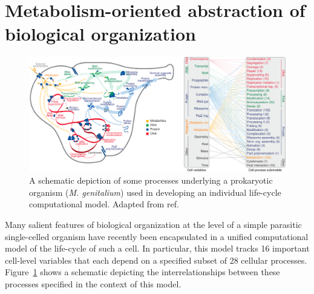\documentclass[10pt]{article}
\begin{document}
\section*{Metabolism-oriented abstraction of biological organization}

\begin{figure}
\begin{center}
\noindent\includegraphics[width=0.8\columnwidth]{fig/cellprocessesdiagram.pdf}
\end{center}
\caption{A schematic depiction of some processes underlying a prokaryotic organism (\emph{M. genitalium}) used in developing an individual life-cycle computational model. Adapted from ref.}
\label{fig:cellprocess}
\end{figure}
Many salient features of biological organization at the level of a simple parasitic single-celled organism have recently been encapsulated in a unified computational model of the life-cycle of such a cell. In particular, this model tracks 16 important cell-level variables that each depend on a specified subset of 28 cellular processes. Figure~\ref{fig:cellprocess} shows a schematic depicting the interrelationships between these processes specified in the context of this model.
\end{document}

